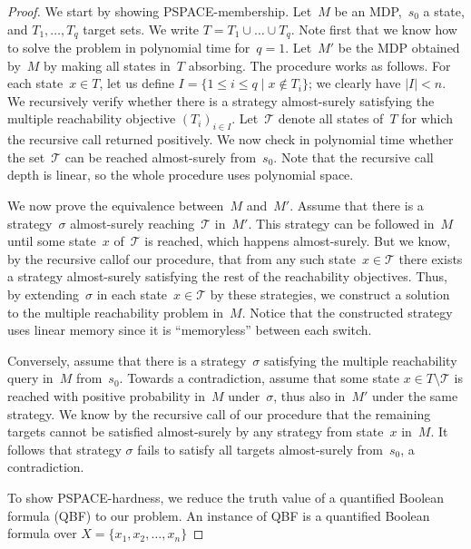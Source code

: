 \documentclass{llncs}
\newcommand\calT{\ensuremath{\mathcal{T}}}
\newcommand\PSPACE{\textrm{\sf PSPACE}}
\begin{document}
\begin{proof}
  We start by showing \PSPACE-membership. Let~$M$ be an MDP,~$s_0$ a state, and $T_1,\ldots,T_q$ target sets. We write
  $T=T_1\cup \ldots \cup T_q$. Note first that we know how to solve the problem in polynomial time for~$q=1$.
  Let~$M'$ be the MDP obtained by~$M$ by making all states in~$T$ absorbing. The procedure works as follows. For each state~$x \in T$,
  let us define $I = \{ 1\leq i\leq q \mid x \not \in T_i\}$; we clearly have $|I|< n$.
  We recursively verify whether there is a strategy almost-surely satisfying the multiple reachability objective $(T_i)_{i \in I}$.
  Let~$\calT$ denote all states of~$T$ for which the recursive call returned positively. We now check in polynomial time whether
  the set~$\calT$ can be reached almost-surely from~$s_0$.
  Note that the recursive call depth is linear, so the whole procedure uses polynomial space.

  We now prove the equivalence between~$M$ and~$M'$. Assume that there is a strategy~$\sigma$ almost-surely reaching~$\calT$ in~$M'$.
  This strategy can be followed in~$M$ until some state~$x$ of~$\calT$ is reached, which happens almost-surely. But we know, by the recursive callof our procedure, that from any such state~$x \in \calT$ there exists a strategy almost-surely satisfying the rest of the reachability objectives.
  Thus, by extending~$\sigma$ in each state~$x \in \calT$ by these strategies, we construct a solution to the multiple reachability problem in~$M$. Notice that the constructed strategy uses linear memory since it is ``memoryless'' between each switch.

  Conversely, assume that there is a strategy~$\sigma$ satisfying the multiple reachability query in~$M$ from~$s_0$.
  Towards a contradiction, assume that some state $x \in T \setminus \calT$ is reached with positive probability in~$M$ under~$\sigma$, 
  thus also in~$M'$ under the same strategy. We know by the recursive call of our procedure that the remaining targets cannot be satisfied 
  almost-surely by any strategy from state~$x$ in~$M$. It follows that strategy $\sigma$ fails to satisfy all targets almost-surely 
  from~$s_0$, a contradiction.
  
  
  
  To show \PSPACE-hardness, we reduce the truth value of a quantified Boolean formula (QBF) to our problem. An instance of QBF is a quantified Boolean formula over $X=\{x_1,x_2,\dots,x_n\}$
  


\end{proof}
\end{document}
